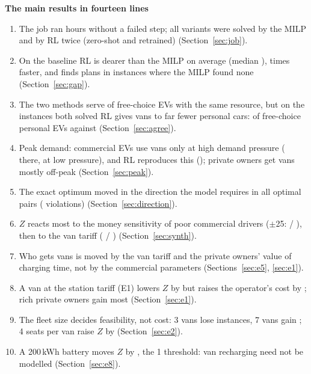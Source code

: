 \begin{keybox}
{\color{headblue}\textbf{The main results in fourteen lines}}
\begin{enumerate}[leftmargin=1.4em,itemsep=1pt]
  \item The job ran \JobHours{} hours without a failed step; all \NVariants{} variants were solved by the MILP and by RL twice (zero-shot and retrained) (Section~\ref{sec:job}).
  \item On the baseline RL is \GapMean\pct{} dearer than the MILP on average (median \GapMedian\pct{}), \SpeedUp{} times faster, and finds plans in \RlOnly{} instances where the MILP found none (Section~\ref{sec:gap}).
  \item The two methods serve \AgreeFree\pct{} of free-choice EVs with the same resource, but on the instances both solved RL gives vans to far fewer personal cars: \VanPersonalRl\pct{} of free-choice personal EVs against \VanPersonalMilp\pct{} (Section~\ref{sec:agree}).
  \item Peak demand: commercial EVs use vans only at high demand pressure (\PVanCommercialHighMilp\pct{} there, \PVanCommercialLowMilp\pct{} at low pressure), and RL reproduces this (\PVanCommercialHighRl\pct{}); private owners get vans mostly off-peak (Section~\ref{sec:peak}).
  \item The exact optimum moved in the direction the model requires in all \DirPairs{} optimal pairs (\DirBad{} violations) (Section~\ref{sec:direction}).
  \item $Z$ reacts most to the money sensitivity of poor commercial drivers ($\pm$25\pct{}: \dZEsixComLoMilp\pct{} / \dZEsixComHiMilp\pct{}), then to the van tariff (\dZEonePMLoMilp\pct{} / \dZEonePMHiMilp\pct{}) (Section~\ref{sec:synth}).
  \item Who gets vans is moved by the van tariff and the private owners' value of charging time, not by the commercial parameters (Sections~\ref{sec:e5}, \ref{sec:e1}).
  \item A van at the station tariff (E1) lowers $Z$ by \dZEonePMLoMilp\pct{} but raises the operator's cost by \dOpEonePMLoMilp\pct{}; rich private owners gain most (Section~\ref{sec:e1}).
  \item The fleet size decides feasibility, not cost: 3 vans lose \LostEtwoVansLoMilp{} instances, 7 vans gain \NewEtwoVansHiMilp{}; 4 seats per van raise $Z$ by \dZEtwoSeatsLoMilp\pct{} (Section~\ref{sec:e2}).
  \item A 200\,kWh battery moves $Z$ by \dZEeightBatHiMilp\pct{}, \EeightDecision{} the 1\pct{} threshold: van recharging need not be modelled (Section~\ref{sec:e8}).

\end{enumerate}
\end{keybox}
